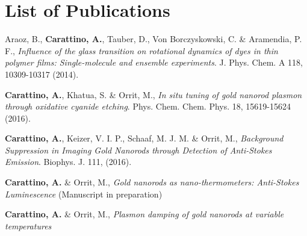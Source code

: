 \chapter*{List of Publications}
\label{publications}

\begin{etaremune}{\small

\item Araoz, B., \textbf{Carattino, A.}, Tauber, D., Von Borczyskowski, C. \&
Aramendia, P. F., \textit{Influence of the glass transition on rotational
dynamics of dyes in thin polymer films: Single-molecule and ensemble
experiments}. J. Phys. Chem. A 118, 10309-10317 (2014).
\item \textbf{Carattino, A.}, Khatua, S. \& Orrit, M., \textit{In situ tuning of
gold nanorod plasmon through oxidative cyanide etching}. Phys. Chem. Chem. Phys.
18, 15619-15624 (2016).
\item \textbf{Carattino, A.}, Keizer, V. I. P., Schaaf, M. J. M. \& Orrit, M.,
\textit{Background Suppression in Imaging Gold Nanorods through Detection of
Anti-Stokes Emission}. Biophys. J. 111, (2016).
\item \textbf{Carattino, A.} \& Orrit, M., \textit{Gold nanorods as
nano-thermometers: Anti-Stokes Luminescence} (Manuscript in preparation)
\item \textbf{Carattino, A.} \& Orrit, M., \textit{Plasmon damping of gold
nanorods at variable temperatures}

}\end{etaremune}

